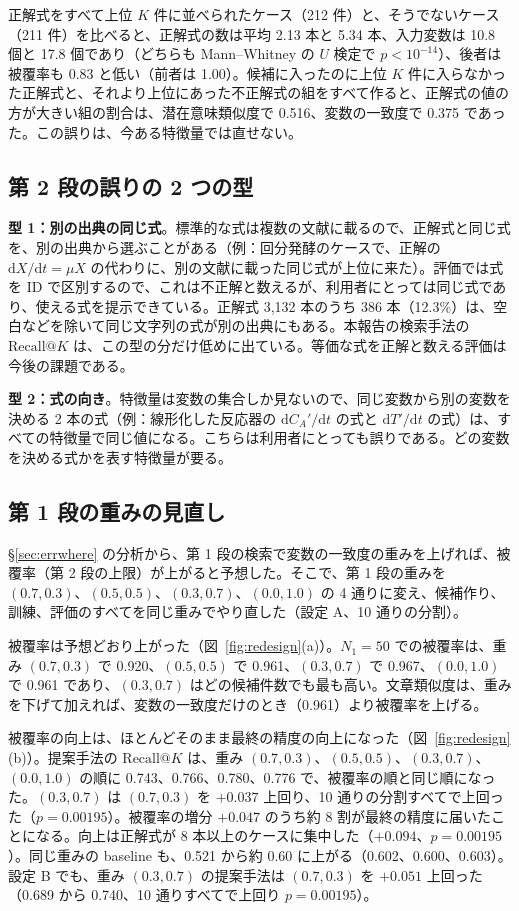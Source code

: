 \documentclass[a4j,dvipdfmx,11pt]{jresume}
\makeatletter
\newcommand{\rk}{\textrm{Recall@}K}
\makeatother
\begin{document}
正解式をすべて上位 $K$ 件に並べられたケース（212 件）と、そうでないケース（211 件）を比べると、正解式の数は平均 2.13 本と 5.34 本、入力変数は 10.8 個と 17.8 個であり（どちらも Mann--Whitney の $U$ 検定で $p < 10^{-14}$）、後者は被覆率も 0.83 と低い（前者は 1.00）。候補に入ったのに上位 $K$ 件に入らなかった正解式と、それより上位にあった不正解式の組をすべて作ると、正解式の値の方が大きい組の割合は、潜在意味類似度で 0.516、変数の一致度で 0.375 であった。この誤りは、今ある特徴量では直せない。

\subsection{第 2 段の誤りの 2 つの型}\label{sec:errtypes}
\textbf{型 1：別の出典の同じ式}。標準的な式は複数の文献に載るので、正解式と同じ式を、別の出典から選ぶことがある（例：回分発酵のケースで、正解の $\mathrm{d}X/\mathrm{d}t = \mu X$ の代わりに、別の文献に載った同じ式が上位に来た）。評価では式を ID で区別するので、これは不正解と数えるが、利用者にとっては同じ式であり、使える式を提示できている。正解式 3{,}132 本のうち 386 本（12.3\%）は、空白などを除いて同じ文字列の式が別の出典にもある。本報告の検索手法の $\rk$ は、この型の分だけ低めに出ている。等価な式を正解と数える評価は今後の課題である。

\textbf{型 2：式の向き}。特徴量は変数の集合しか見ないので、同じ変数から別の変数を決める 2 本の式（例：線形化した反応器の $\mathrm{d}C_A'/\mathrm{d}t$ の式と $\mathrm{d}T'/\mathrm{d}t$ の式）は、すべての特徴量で同じ値になる。こちらは利用者にとっても誤りである。どの変数を決める式かを表す特徴量が要る。

\subsection{第 1 段の重みの見直し}\label{sec:redesign}
\S\ref{sec:errwhere} の分析から、第 1 段の検索で変数の一致度の重みを上げれば、被覆率（第 2 段の上限）が上がると予想した。そこで、第 1 段の重みを $(0.7, 0.3)$、$(0.5, 0.5)$、$(0.3, 0.7)$、$(0.0, 1.0)$ の 4 通りに変え、候補作り、訓練、評価のすべてを同じ重みでやり直した（設定 A、10 通りの分割）。

被覆率は予想どおり上がった（図~\ref{fig:redesign}(a)）。$N_1 = 50$ での被覆率は、重み $(0.7, 0.3)$ で 0.920、$(0.5, 0.5)$ で 0.961、$(0.3, 0.7)$ で 0.967、$(0.0, 1.0)$ で 0.961 であり、$(0.3, 0.7)$ はどの候補件数でも最も高い。文章類似度は、重みを下げて加えれば、変数の一致度だけのとき（0.961）より被覆率を上げる。

被覆率の向上は、ほとんどそのまま最終の精度の向上になった（図~\ref{fig:redesign}(b)）。提案手法の $\rk$ は、重み $(0.7, 0.3)$、$(0.5, 0.5)$、$(0.3, 0.7)$、$(0.0, 1.0)$ の順に 0.743、0.766、0.780、0.776 で、被覆率の順と同じ順になった。$(0.3, 0.7)$ は $(0.7, 0.3)$ を $+0.037$ 上回り、10 通りの分割すべてで上回った（$p = 0.00195$）。被覆率の増分 $+0.047$ のうち約 8 割が最終の精度に届いたことになる。向上は正解式が 8 本以上のケースに集中した（$+0.094$、$p = 0.00195$）。同じ重みの baseline も、0.521 から約 0.60 に上がる（0.602、0.600、0.603）。設定 B でも、重み $(0.3, 0.7)$ の提案手法は $(0.7, 0.3)$ を $+0.051$ 上回った（0.689 から 0.740、10 通りすべてで上回り $p = 0.00195$）。
\end{document}
